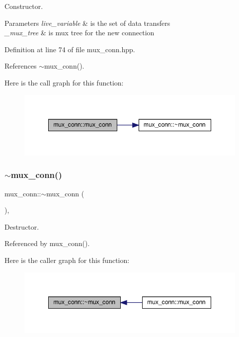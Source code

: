 Constructor. 


\begin{DoxyParams}{Parameters}
{\em live\+\_\+variable} & is the set of data transfers \\
\hline
{\em \+\_\+mux\+\_\+tree} & is mux tree for the new connection \\
\hline
\end{DoxyParams}


Definition at line 74 of file mux\+\_\+conn.\+hpp.



References $\sim$mux\+\_\+conn().

Here is the call graph for this function\+:
\nopagebreak
\begin{figure}[H]
\begin{center}
\leavevmode
\includegraphics[width=348pt]{db/d89/classmux__conn_a3616b9557bc1ac18705d4843db42cfcd_cgraph}
\end{center}
\end{figure}
\mbox{\label{classmux__conn_a1c99a9d926db261e3d353189591fa4bd}} 
\subsubsection{\texorpdfstring{$\sim$mux\+\_\+conn()}{~mux\_conn()}}
{\footnotesize\ttfamily mux\+\_\+conn\+::$\sim$mux\+\_\+conn (\begin{DoxyParamCaption}{ }\end{DoxyParamCaption})\hspace{0.3cm}{\ttfamily [override]}, {\ttfamily [default]}}



Destructor. 



Referenced by mux\+\_\+conn().

Here is the caller graph for this function\+:
\nopagebreak
\begin{figure}[H]
\begin{center}
\leavevmode
\includegraphics[width=348pt]{db/d89/classmux__conn_a1c99a9d926db261e3d353189591fa4bd_icgraph}
\end{center}
\end{figure}


